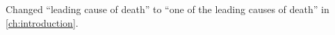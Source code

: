 Changed ``leading cause of death'' to ``one of the leading causes of death'' in \autoref{ch:introduction}.